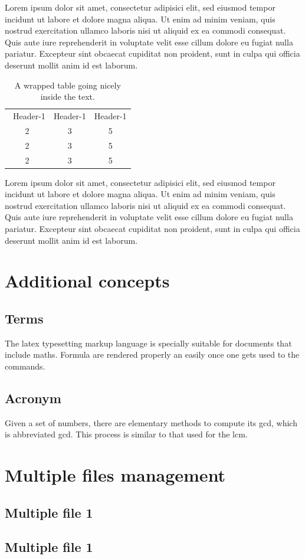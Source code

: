 \documentclass[a4paper, oneside]{book}
\begin{document}
Lorem ipsum dolor sit amet, consectetur adipisici elit, sed eiusmod tempor incidunt ut labore et dolore magna aliqua. Ut enim ad minim veniam, quis nostrud exercitation ullamco laboris nisi ut aliquid ex ea commodi consequat. Quis aute iure reprehenderit in voluptate velit esse cillum dolore eu fugiat nulla pariatur. Excepteur sint obcaecat cupiditat non proident, sunt in culpa qui officia deserunt mollit anim id est laborum.
\begin{table}
\caption{A wrapped table going nicely inside the text.}\label{wrap-tab:1}
\begin{tabular}{ccc}\  
Header-1 & Header-1 & Header-1 \\
2 &3 & 5\\  
2 &3 & 5\\  
2 &3 & 5\\  
\end{tabular}
\end{table}
Lorem ipsum dolor sit amet, consectetur adipisici elit, sed eiusmod tempor incidunt ut labore et dolore magna aliqua. Ut enim ad minim veniam, quis nostrud exercitation ullamco laboris nisi ut aliquid ex ea commodi consequat. Quis aute iure reprehenderit in voluptate velit esse cillum dolore eu fugiat nulla pariatur. Excepteur sint obcaecat cupiditat non proident, sunt in culpa qui officia deserunt mollit anim id est laborum.

\chapter{Additional concepts}

\section{Terms} 

The \Gls{latex} typesetting markup language is specially suitable 
for documents that include maths. Formula are rendered 
properly an easily once one gets used to the commands.

\section{Acronym}

Given a set of numbers, there are elementary methods to compute 
its \ac{gcd}, which is abbreviated gcd. This 
process is similar to that used for the lcm.

\chapter{Multiple files management}
\section{Multiple file 1}


\section{Multiple file 1}

\printbibliography

\appendix

 
\end{document}
